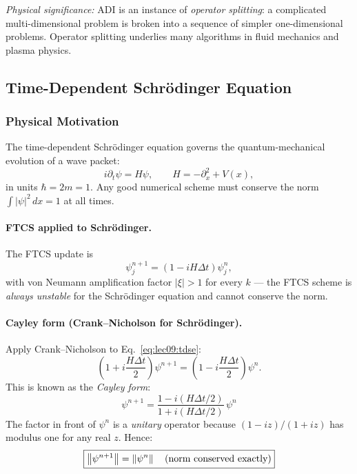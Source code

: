 \textit{Physical significance:} ADI is an instance of \emph{operator
splitting}: a complicated multi-dimensional problem is broken into a
sequence of simpler one-dimensional problems.  Operator splitting
underlies many algorithms in fluid mechanics and plasma physics.

\subsection{Time-Dependent Schrödinger Equation}
\label{subsec:lec09:schrodinger}

\subsubsection*{Physical Motivation}
The time-dependent Schrödinger equation governs the quantum-mechanical
evolution of a wave packet:
\begin{equation}
  i\partial_t\psi = H\psi,
  \qquad
  H = -\partial_x^2 + V(x),
  \label{eq:lec09:tdse}
\end{equation}
in units $\hbar=2m=1$.  Any good numerical scheme must conserve the
norm $\int|\psi|^2\, dx=1$ at all times.

\paragraph{FTCS applied to Schrödinger.}
The FTCS update is
\begin{equation}
  \psi_j^{n+1} = (1-iH\Delta t)\psi_j^{n},
  \label{eq:lec09:tdse-ftcs}
\end{equation}
with von Neumann amplification factor $|\xi|>1$ for every $k$ — the
FTCS scheme is \emph{always unstable} for the Schrödinger equation and
cannot conserve the norm.

\paragraph{Cayley form (Crank--Nicholson for Schrödinger).}
Apply Crank--Nicholson to Eq.~\eqref{eq:lec09:tdse}:
\begin{equation}
  \left(1+i\frac{H\Delta t}{2}\right)\psi^{n+1}
  = \left(1-i\frac{H\Delta t}{2}\right)\psi^{n}.
  \label{eq:lec09:cayley-raw}
\end{equation}
This is known as the \emph{Cayley form}:
\begin{equation}
  \boxed{
  \psi^{n+1}
  = \frac{1-i(H\Delta t/2)}{1+i(H\Delta t/2)}\,\psi^{n}}
  \label{eq:lec09:cayley}
\end{equation}
The factor in front of $\psi^n$ is a \emph{unitary} operator because
$(1-iz)/(1+iz)$ has modulus one for any real $z$.  Hence:
\begin{equation}
  \boxed{\left\lVert\psi^{n+1}\right\rVert = \left\lVert\psi^{n}\right\rVert
  \quad\text{(norm conserved exactly)}}
  \label{eq:lec09:norm-conservation}
\end{equation}

